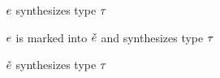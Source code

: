 \judgbox{\ctxSynTypeU{\ctx}{\EMV}{\TMV}} $\EMV$ synthesizes type $\TMV$
%
\begin{mathpar}
\end{mathpar}

\judgbox{\ctxSynFixedInto{\ctx}{\EMV}{\ECMV}{\TMV}} $\EMV$ is marked into $\ECMV$ and synthesizes type $\TMV$
%
\begin{mathpar}
\end{mathpar}

\judgbox{\ctxSynTypeM{\ctx}{\ECMV}{\TMV}} $\ECMV$ synthesizes type $\TMV$
%
\begin{mathpar}
\end{mathpar}



